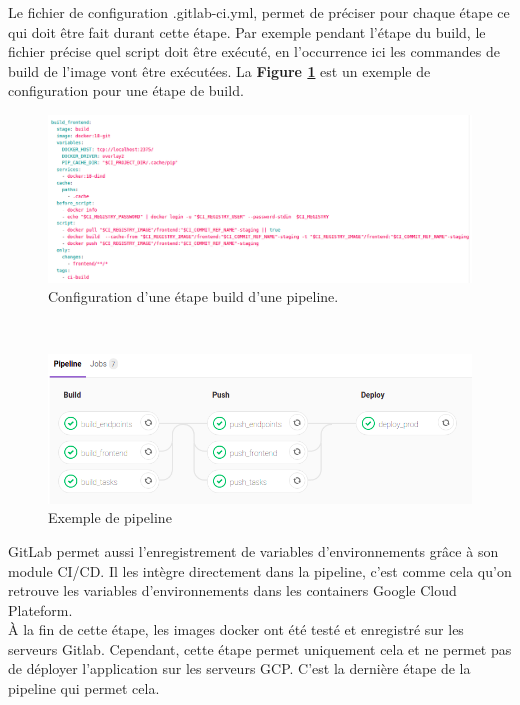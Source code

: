 \documentclass{article} %
\begin{document}
Le fichier de configuration .gitlab-ci.yml, permet de préciser pour chaque étape ce qui doit être fait durant cette étape. Par exemple pendant l'étape du build, le fichier précise quel script doit être exécuté, en l'occurrence ici les commandes de build de l'image vont être exécutées. La \textbf{Figure \ref{fig:gitlab-ci}} est un exemple de configuration pour une étape de build.

\begin{figure}[!h]
 \centering
 \includegraphics[keepaspectratio = true,scale=0.4]{gitlab.png}
 \caption{Configuration d'une étape build d'une pipeline.}
 \label{fig:gitlab-ci}
\end{figure}
~\\
\begin{figure}[!h]
 \centering
 \includegraphics[keepaspectratio = true,scale=0.4]{pipeline.png}
 \caption{Exemple de pipeline}
 \label{fig:pipeline}
\end{figure}

GitLab permet aussi l'enregistrement de variables d'environnements grâce à son module CI/CD. Il les intègre directement dans la pipeline, c'est comme cela qu'on retrouve les variables d'environnements dans les containers Google Cloud Plateform.\\

À la fin de cette étape, les images docker ont été testé et enregistré sur les serveurs Gitlab. Cependant, cette étape permet uniquement cela et ne permet pas de déployer l'application sur les serveurs GCP. C'est la dernière étape de la pipeline qui permet cela.
\end{document}

